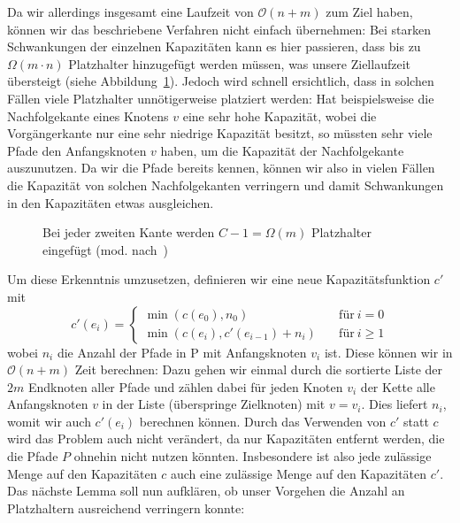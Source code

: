 Da wir allerdings insgesamt eine Laufzeit von $\mathcal O(n+m)$ zum Ziel haben, können wir das beschriebene Verfahren
nicht einfach übernehmen:
Bei starken Schwankungen der einzelnen Kapazitäten kann es hier passieren, dass bis zu $\Omega(m\cdot n)$
Platzhalter hinzugefügt werden müssen, was unsere Ziellaufzeit übersteigt (siehe Abbildung~\ref{fig:dummy-paths-too-many}).
Jedoch wird schnell ersichtlich, dass in solchen Fällen viele Platzhalter unnötigerweise platziert werden:
Hat beispielsweise die Nachfolgekante eines Knotens $v$ eine sehr hohe Kapazität, wobei die Vorgängerkante nur eine sehr
niedrige Kapazität besitzt, so müssten sehr viele Pfade den Anfangsknoten $v$ haben, um die Kapazität der
Nachfolgekante auszunutzen.
Da wir die Pfade bereits kennen, können wir also in vielen Fällen die Kapazität von solchen Nachfolgekanten verringern und
damit Schwankungen in den Kapazitäten etwas ausgleichen.

\begin{figure}[htbp]
	\centering
	\def\svgwidth{250bp}
	
	\caption{Bei jeder zweiten Kante werden $C-1=\Omega(m)$ Platzhalter eingefügt (mod. nach~\cite{paper})}
	\label{fig:dummy-paths-too-many}
\end{figure}

Um diese Erkenntnis umzusetzen, definieren wir eine neue Kapazitätsfunktion $c'$ mit
\[
	c'(e_i) =
	\begin{cases}
		\min(c(e_0), n_0) &\quad\text{für}\ i=0\\
		\min(c(e_i), c'(e_{i-1}) + n_i) &\quad\text{für}\ i \geq 1
	\end{cases}
\]
wobei $n_i$ die Anzahl der Pfade in P mit Anfangsknoten $v_i$ ist.
Diese können wir in $\mathcal O(n+m)$ Zeit berechnen: Dazu gehen wir einmal durch die sortierte Liste der $2m$ Endknoten
aller Pfade und zählen dabei für jeden Knoten $v_i$ der Kette alle Anfangsknoten $v$ in der Liste (überspringe Zielknoten) mit $v = v_i$.
Dies liefert $n_i$, womit wir auch $c'(e_i)$ berechnen können.
Durch das Verwenden von $c'$ statt $c$ wird das Problem auch nicht verändert, da nur Kapazitäten entfernt
werden, die die Pfade $P$ ohnehin nicht nutzen könnten.
Insbesondere ist also jede zulässige Menge auf den Kapazitäten $c$ auch eine zulässige Menge auf den Kapazitäten $c'$.
Das nächste Lemma soll nun aufklären, ob unser Vorgehen die Anzahl an Platzhaltern ausreichend verringern konnte:


